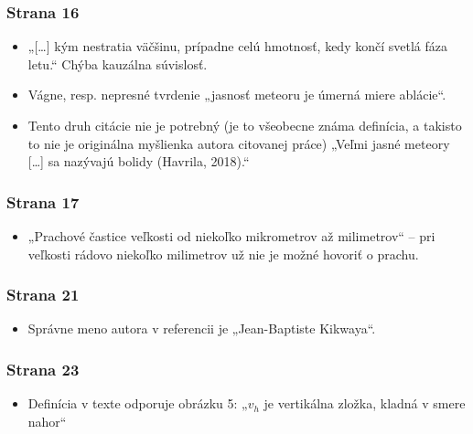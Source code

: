 \hypertarget{strana-16}{%
\subsubsection{Strana 16}\label{strana-16}}

\begin{itemize}
\tightlist
\item
  „{[}\ldots{}{]} kým nestratia väčšinu, prípadne celú hmotnosť, kedy
  končí svetlá fáza letu.“ Chýba kauzálna súvislosť.
\item
  Vágne, resp. nepresné tvrdenie „jasnosť meteoru je úmerná miere
  ablácie“.
\item
  Tento druh citácie nie je potrebný (je to všeobecne známa definícia, a
  takisto to nie je originálna myšlienka autora citovanej práce) „Veľmi
  jasné meteory {[}\ldots{}{]} sa nazývajú bolidy (Havrila, 2018).“
\end{itemize}

\hypertarget{strana-17}{%
\subsubsection{Strana 17}\label{strana-17}}

\begin{itemize}
\tightlist
\item
  „Prachové častice veľkosti od niekoľko mikrometrov až milimetrov“ --
  pri veľkosti rádovo niekoľko milimetrov už nie je možné hovoriť o
  prachu.
\end{itemize}

\hypertarget{strana-21}{%
\subsubsection{Strana 21}\label{strana-21}}

\begin{itemize}
\tightlist
\item
  Správne meno autora v referencii je „Jean-Baptiste Kikwaya“.
\end{itemize}

\hypertarget{strana-23}{%
\subsubsection{Strana 23}\label{strana-23}}

\begin{itemize}
\tightlist
\item
  Definícia v texte odporuje obrázku 5: „\(v_h\) je vertikálna zložka,
  kladná v smere nahor“
\end{itemize}

